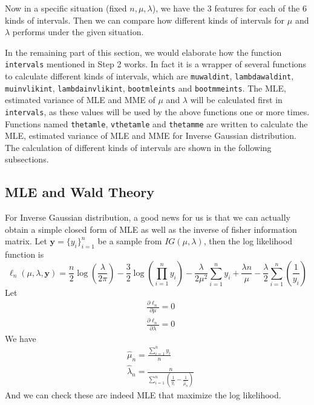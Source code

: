\documentclass{article}
\begin{document}
    Now in a specific situation (fixed $n, \mu, \lambda$), we have the 3 features for each of the 6 kinds of intervals. Then we can compare how different kinds of intervals for $\mu$ and $\lambda$ performs under the given situation.
    
    In the remaining part of this section, we would elaborate how the function \verb|intervals| mentioned in Step 2 works. In fact it is a wrapper of several functions to calculate different kinds of intervals, which are \verb|muwaldint|, \verb|lambdawaldint|, \verb|muinvlikint|, \verb|lambdainvlikint|, \verb|bootmleints| and \verb|bootmmeints|. The MLE, estimated variance of MLE and MME of $\mu$ and $\lambda$ will be calculated first in \verb|intervals|, as these values will be used by the above functions one or more times. Functions named \verb|thetamle|, \verb|vthetamle| and \verb|thetamme| are written to calculate the MLE, estimated variance of MLE and MME for Inverse Gaussian distribution. The calculation of different kinds of intervals are shown in the following subsections.

	\subsection{MLE and Wald Theory}
    For Inverse Gaussian distribution, a good news for us is that we can actually obtain a simple closed form of MLE as well as the inverse of fisher information matrix. Let $\bm y = \{y_i\}_{i=1}^n$ be a sample from $IG(\mu, \lambda)$, then the log likelihood function is
    \[\ell_n (\mu, \lambda, \bm y) = \frac{n}{2} \log\left(\frac{\lambda}{2 \pi}\right) - \frac{3}{2}\log\left(\prod_{i=1}^n y_i\right) - \frac{\lambda}{2 \mu^2} \sum_{i=1}^n y_i + \frac{\lambda n}{\mu} - \frac{\lambda}{2} \sum_{i=1}^n \left(\frac{1}{y_i}\right)\]
    Let
    \begin{align*}
    &\frac{\partial \ell_n}{\partial \mu} = 0\\
    &\frac{\partial \ell_n}{\partial \lambda} = 0
    \end{align*}
    We have
    \begin{align*}
    & \hat{\mu}_n = \frac{\sum_{i=1}^n y_i}{n}\\
    & \hat{\lambda}_n = \frac{n}{\sum_{i=1}^n \left(\frac{1}{y_i} - \frac{1}{\hat{\mu}_n}\right)}
    \end{align*}
    And we can check these are indeed MLE that maximize the log likelihood.
\end{document}
